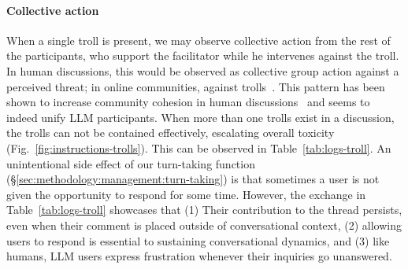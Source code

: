 \paragraph{Collective action}
When a single troll is present, we may observe collective action from the rest of the participants, who support the facilitator while he intervenes against the troll. In human discussions, this would be observed as collective group action against a perceived threat; in online communities, against trolls~\cite{sun2021would,jakubowicz2017cyber,coles2016trolling}. This pattern has been shown to increase community cohesion in human discussions~\cite{hopkinson2013trolling} and seems to indeed unify LLM participants. When more than one trolls exist in a discussion, the trolls can not be contained effectively, escalating overall toxicity (Fig.~\ref{fig:instructions-trolls}). This can be observed in Table~\ref{tab:logs-troll}.  An unintentional side effect of our turn-taking function (\S\ref{sec:methodology:management:turn-taking}) is that sometimes a user is not given the opportunity to respond for some time. However, the exchange in  Table~\ref{tab:logs-troll} showcases that (1) Their contribution to the thread persists, even when their comment is placed outside of conversational context, (2) allowing users to respond is essential to sustaining conversational dynamics, and (3) like humans, LLM users express frustration whenever their inquiries go unanswered.

